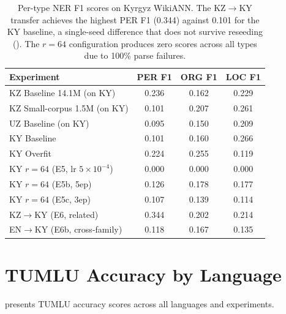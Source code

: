 \documentclass[11pt]{article}
\begin{document}
\begin{table}[!htbp]
\centering
\small
\begin{tabular}{lccc}
\toprule
\textbf{Experiment} & \textbf{PER F1} & \textbf{ORG F1} & \textbf{LOC F1} \\
\midrule
KZ Baseline 14.1M (on KY) & 0.236 & 0.162 & 0.229 \\
KZ Small-corpus 1.5M (on KY) & 0.101 & 0.207 & 0.261 \\
UZ Baseline (on KY) & 0.095 & 0.150 & 0.209 \\
KY Baseline & 0.101 & 0.160 & 0.266 \\
KY Overfit & 0.224 & 0.255 & 0.119 \\
KY $r{=}64$ (E5, lr $5{\times}10^{-4}$) & 0.000 & 0.000 & 0.000 \\
KY $r{=}64$ (E5b, 5ep) & 0.126 & 0.178 & 0.177 \\
KY $r{=}64$ (E5c, 3ep) & 0.107 & 0.139 & 0.114 \\
KZ$\rightarrow$KY (E6, related) & 0.344 & 0.202 & 0.214 \\
EN$\rightarrow$KY (E6b, cross-family) & 0.118 & 0.167 & 0.135 \\
\bottomrule
\end{tabular}
\caption{Per-type NER F1 scores on Kyrgyz WikiANN. The KZ$\rightarrow$KY transfer achieves the highest PER F1 (0.344) against 0.101 for the KY baseline, a single-seed difference that does not survive reseeding (). The $r{=}64$ configuration produces zero scores across all types due to 100\% parse failures.}
\label{tab:ner_pertype}
\end{table}

\section{TUMLU Accuracy by Language}
\label{app:tumlu}

 presents TUMLU accuracy scores across all languages and experiments.
\end{document}
